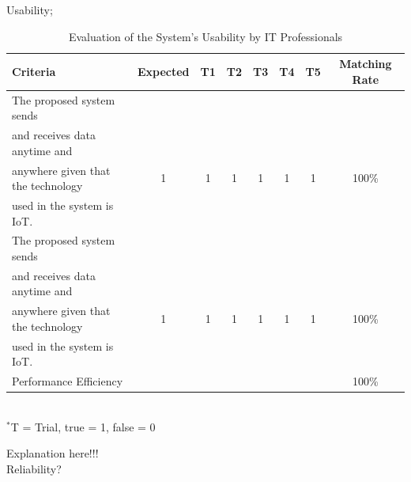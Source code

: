 \indent\indent Usability; \\
\begin{table}[h!]
\caption{Evaluation of the System’s Usability by IT Professionals}
\vspace{-1em}
\begin{center}
\fontsize{10}{12}\selectfont
\begin{tabular}{|| l c c c c c c c ||} 
 \hline
 Criteria & Expected & T1 & T2 & T3 & T4 & T5 & Matching Rate \\ [0.5ex] 
 \hline\hline
The proposed system sends &  &  &  &  &  &  &  \\
and receives data anytime and &  &  &  &  &  &  &  \\
anywhere given that the technology & 1 & 1 & 1 & 1 & 1 & 1 & 100\% \\
used in the system is IoT. &  &  &  &  &  &  &  \\ 
\hline
The proposed system sends &  &  &  &  &  &  &  \\
and receives data anytime and &  &  &  &  &  &  &  \\
anywhere given that the technology & 1 & 1 & 1 & 1 & 1 & 1 & 100\% \\
used in the system is IoT. &  &  &  &  &  &  &  \\ 
\hline
Performance Efficiency &  &  &  &  &  &  & 100\% \\ 
\hline
\end{tabular} \\
\footnotesize{\hspace{-10cm}$^*$T = Trial, true = 1, false = 0}
\end{center}
\end{table} 

Explanation here!!! \lipsum[1] \\


\indent\indent Reliability? \\

